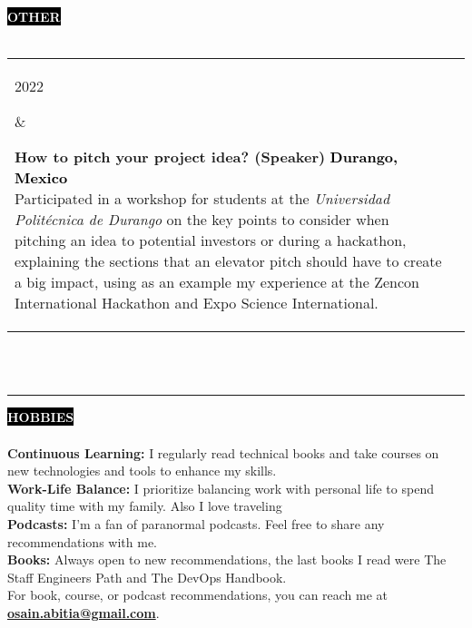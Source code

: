 \documentclass[10pt,A4]{article}
\makeatletter
\newcounter{a}
\newcounter{b}
\newcounter{c}
\newcommand{\cvsection}[1] {
	\textcolor{white}{\MakeUppercase{\textbf{#1}}}
}
\newcommand{\cvsect}[1]{
	\colorbox{black}{{\cvsection{#1}}}\\\\%
}
\newenvironment{entrylist}{%
	\begin{tabular*}{\textwidth}[t]{@{\extracolsep{\fill}}ll}
	}{%
	\end{tabular*}
}
\newcommand{\entry}[4]{%
	\parbox[t]{3.5cm}{%
		#1%
	}%
	&\parbox[t]{14cm}{%
		\textbf{#2}%
		\hfill%
		{\footnotesize \textbf{\textcolor{black}{#3}}}\\%
		#4%
	}\\\\}
\makeatother
\begin{document}
	\cvsect{Other}
	\begin{entrylist}
		\entry
		{2022}
		{How to pitch your project idea? (Speaker)}
		{Durango, Mexico}
		{Participated in a workshop for students at the \textit{Universidad Politécnica de Durango} on the key points
		to consider when pitching an idea to potential investors or during a hackathon, explaining the
		sections that an elevator pitch should have to create a big impact, using as an example my experience
		at the Zencon International Hackathon and Expo Science International.}
		\entry
		{2020}
		{World Sustainable Development Forum (Volunteer)}
		{Durango, Mexico}
		{Translator for the speakers at the World Sustainable Development Forum, translating from English to Spanish
		and vice versa during the 3 days the event lasted. This forum had as its main objective to discuss climate
		change to encourage the citizens to take action against it.}
	\end{entrylist}%
	\\\\

	
	
	\begin{minipage}[t]{0.5\textwidth}\hrule height 0pt width 0pt%
		\cvsect{Hobbies}
		{\textbf{Continuous Learning:} I regularly read technical books and take courses on new technologies and tools to enhance my skills.}\\
		{\textbf{Work-Life Balance:} I prioritize balancing work with personal life to spend quality time with my family. Also I love traveling}\\
		{\textbf{Podcasts:} I'm a fan of paranormal podcasts. Feel free to share any recommendations with me.}\\
		{\textbf{Books:} Always open to new recommendations, the last books I read were The Staff Engineers Path and The DevOps Handbook.}\\
		\hfil\break
		{For book, course, or podcast recommendations, you can reach me at \href{mailto:osain.abitia@gmail.com}{\textbf{osain.abitia@gmail.com}}.}\\

	\end{minipage}%
	
\end{document}
